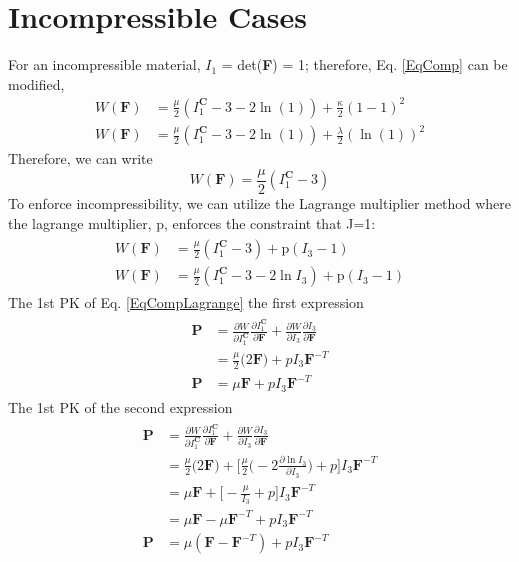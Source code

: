 \documentclass[12pt,3p]{article}
\numberwithin{equation}{section}
\begin{document}
\section{Incompressible Cases}
For an incompressible material, $I_1$ = det(\textbf{F}) = 1; therefore, Eq. \ref{EqComp} can be modified, 
\begin{align*}
W(\mathbf{F}) &= \frac{\mu}{2} (I_1^{\mathbf{C}} - 3 - 2 \ln (1)) + \frac{\kappa}{2} (1 - 1)^2  \\
W(\mathbf{F}) &= \frac{\mu}{2} (I_1^{\mathbf{C}} - 3 - 2 \ln (1)) + \frac{\lambda}{2} (\ln (1))^2  
\end{align*}
Therefore, we can write
\begin{equation}\label{EqComp}
W (\mathbf{F})  = \frac{\mu}{2} (I_1^{\mathbf{C}}  - 3) 
\end{equation}
To enforce incompressibility, we can utilize the Lagrange multiplier method where the lagrange multiplier, p, enforces the constraint that J=1: 
\begin{align}\label{EqCompLagrange}
\begin{split}
W(\mathbf{F}) &= \frac{\mu}{2} (I_1^{\mathbf{C}}  - 3)  + \text{p} (I_3-1) \\
W(\mathbf{F}) &= \frac{\mu}{2} (I_1^{\mathbf{C}}  - 3 - 2 \ln I_3 )  + \text{p} (I_3-1) 
\end{split}
\end{align}
The 1st PK of Eq. \ref{EqCompLagrange} the first expression 
\begin{align*}
\begin{split}
\mathbf{P} &= \frac{\partial W}{\partial I_1^\mathbf{C}} \frac{\partial I_1^\mathbf{C}}{\partial \mathbf{F}} + \frac{\partial W}{\partial I_3} \frac{\partial I_3}{\partial \mathbf{F}} \\
		&= \frac{\mu}{2} \big( 2 \mathbf{F} \big) + p I_3 \mathbf{F}^{-T} \\
\mathbf{P} &= \mu \mathbf{F} + p I_3 \mathbf{F}^{-T} 
\end{split}
\end{align*}
The 1st PK of the second expression 
\begin{align}
\begin{split}
\mathbf{P} &= \frac{\partial W}{\partial I_1^\mathbf{C}} \frac{\partial I_1^\mathbf{C}}{\partial \mathbf{F}} + \frac{\partial W}{\partial I_3} \frac{\partial I_3}{\partial \mathbf{F}} \\
		&= \frac{\mu}{2} \big( 2 \mathbf{F} \big) + \bigg[ \frac{\mu}{2} \big( -2 \frac{\partial \ln I_3}{\partial I_3}\big) + p \bigg] I_3 \mathbf{F}^{-T} \\
		&= \mu \mathbf{F} + \bigg[ - \frac{\mu}{I_3} + p \bigg] I_3 \mathbf{F}^{-T} \\
		&=  \mu \mathbf{F} - \mu \mathbf{F}^{-T} +p I_3 \mathbf{F}^{-T} \\
\mathbf{P} &= \mu ( \mathbf{F} - \mathbf{F}^{-T}) + p I_3 \mathbf{F}^{-T} 
\end{split}
\end{align}
\end{document}
